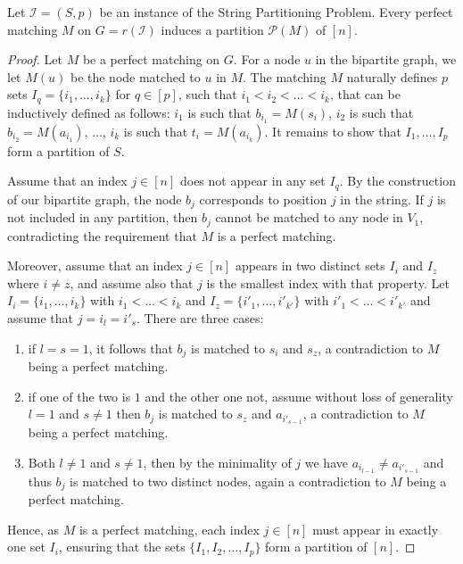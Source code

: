 \begin{lemma} \label{lemma:matching_induces_partition}
    Let $\mathcal{I}=(S, p)$ be an instance of the String Partitioning Problem. Every perfect matching $M$ on $G = r(\mathcal{I})$ induces a partition $\mathcal{P}(M)$ of $[n]$.
\end{lemma}
\begin{proof}
    Let $M$ be a perfect matching on $G$. For a node $u$ in the bipartite graph, we let $M(u)$ be the node matched to $u$ in $M$. The matching $M$ naturally defines $p$ sets $I_q=\{i_1,\dots,i_k\}$ for $q\in[p]$, such that $i_1 <i_2<\dots<i_k$, that can be inductively defined as follows: $i_1$ is such that $b_{i_1} = M(s_i)$, $i_2$ is such that $b_{i_2} = M(a_{i_1})$, $\dots$, $i_k$ is such that $t_i = M(a_{i_k})$. It remains to show that $I_1,\dots,I_p$ form a partition of $S$.

    Assume that an index $j \in [n]$ does not appear in any set $I_q$. By the construction of our bipartite graph, the node $b_j$ corresponds to position $j$ in the string. If $j$ is not included in any partition, then $b_j$ cannot be matched to any node in $V_1$, contradicting the requirement that $M$ is a perfect matching. 
    
    Moreover, assume that an index $j \in [n]$ appears in two distinct sets $I_i$ and $I_z$ where $i \neq z$, and assume also that $j$ is the smallest index with that property. Let $I_i=\{i_1,\dots,i_k\}$ with $i_1<\dots<i_k$ and $I_z=\{i'_1,\dots,i'_{k'}\}$ with $i'_1<\dots<i'_{k'}$ and assume that $j=i_l=i'_s$. There are three cases:
    \begin{enumerate}
        \item if $l=s=1$, it follows that $b_j$ is matched to $s_i$ and $s_z$, a contradiction to $M$ being a perfect matching.
        \item if one of the two is $1$ and the other one not, assume without loss of generality $l=1$ and $s\neq1$ then $b_j$ is matched to $s_z$ and $a_{i'_{s-1}}$, a contradiction to $M$ being a perfect matching.
        \item Both $l\neq1$ and $s\neq1$, then by the minimality of $j$ we have $a_{i_{l-1}} \neq a_{i'_{s-1}}$ and thus $b_j$ is matched to two distinct nodes, again a contradiction to $M$ being a perfect matching.
    \end{enumerate}

    Hence, as $M$ is a perfect matching, each index $j \in [n]$ must appear in exactly one set $I_i$, ensuring that the sets $\{I_1, I_2, \ldots, I_p\}$ form a partition of $[n]$.
\end{proof}

